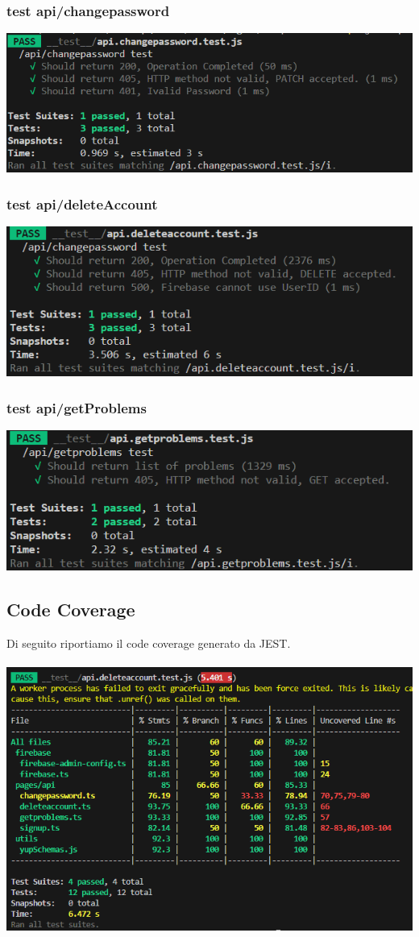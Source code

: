 \documentclass[11pt, a4paper]{article}
\theoremstyle{definition}
\begin{document}
\subsubsection{test api/changepassword}
\includegraphics[width=\textwidth]{materiale/testing/ChangePw.png}
\subsubsection{test api/deleteAccount}
\includegraphics[width=\textwidth]{materiale/testing/DeleteAccount.png}
\subsubsection{test api/getProblems}
\includegraphics[width=\textwidth]{materiale/testing/GetProblems.png}
\newpage
\subsection{Code Coverage}
Di seguito riportiamo il code coverage generato da JEST.\\\\
\includegraphics[width=\textwidth]{materiale/testing/Code Coverage.png}
\end{document}
